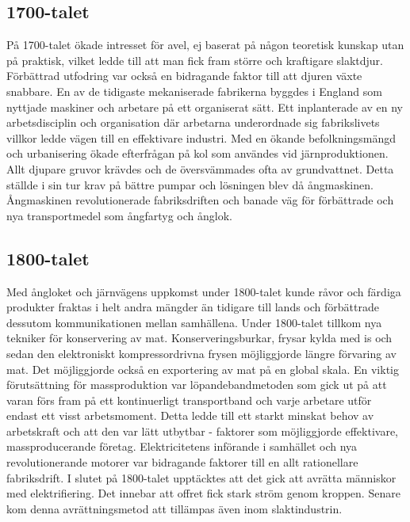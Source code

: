 \subsection{1700-talet}
På 1700-talet ökade intresset för avel, ej baserat på någon teoretisk kunskap utan på praktisk, vilket ledde till att man fick fram större och kraftigare slaktdjur. Förbättrad utfodring var också en bidragande faktor till att djuren växte snabbare. \citep{denskapande}
\newline
\newline
En av de tidigaste mekaniserade fabrikerna byggdes i England som nyttjade maskiner och arbetare på ett organiserat sätt. Ett inplanterade av en ny arbetsdisciplin och organisation där arbetarna underordnade sig fabrikslivets villkor ledde vägen till en effektivare industri. \citep{denskapande}
\newline
\newline
Med en ökande befolkningsmängd och urbanisering ökade efterfrågan på kol som användes vid järnproduktionen. Allt djupare gruvor krävdes och de översvämmades ofta av grundvattnet. Detta ställde i sin tur krav på bättre pumpar och lösningen blev då ångmaskinen. \citep{industriell}
Ångmaskinen revolutionerade fabriksdriften och banade väg för förbättrade och nya transportmedel som ångfartyg och ånglok. \citep{denskapande}

\subsection{1800-talet}
Med ångloket och järnvägens uppkomst under 1800-talet kunde råvor och färdiga produkter fraktas i helt andra mängder än tidigare till lands och förbättrade dessutom kommunikationen mellan samhällena. \citep{denskapande}
\newline
\newline
Under 1800-talet tillkom nya tekniker för konservering av mat. Konserveringsburkar, frysar kylda med is och sedan den elektroniskt kompressordrivna frysen möjliggjorde längre förvaring av mat. \citep{denskapande} 
Det möjliggjorde också en exportering av mat på en global skala. \citep{edgerton}
\newline
\newline
En viktig förutsättning för massproduktion var löpandebandmetoden som gick ut på att varan förs fram på ett kontinuerligt transportband och varje arbetare utför endast ett visst arbetsmoment. Detta ledde till ett starkt minskat behov av arbetskraft och att den var lätt utbytbar - faktorer som möjliggjorde effektivare, massproducerande företag. \citep{denskapande}
\newline
\newline
Elektricitetens införande i samhället och nya revolutionerande motorer var bidragande faktorer till en allt rationellare fabriksdrift. \cite{denskapande}
\newline
\newline
I slutet på 1800-talet upptäcktes att det gick att avrätta människor med elektrifiering. Det innebar att offret fick stark ström genom kroppen. Senare kom denna avrättningsmetod att tillämpas även inom slaktindustrin. \citep{edgerton}

